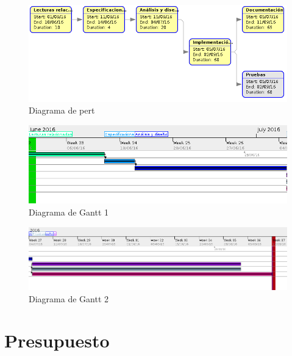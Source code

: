 \newpage
\begin{figure}[!ht]
  \begin{center}
    \includegraphics[width=1\textwidth]{../images/diag_plan/pert.png}
    \caption{Diagrama de pert}
    \label{fig:pert}
  \end{center}
\end{figure}

\begin{figure}[!ht]
  \begin{center}
    \includegraphics[width=1\textwidth]{../images/diag_plan/gantt1.png}
    \caption{Diagrama de Gantt 1}
    \label{fig:diag_gant1}
  \end{center}
\end{figure}

\begin{figure}[!ht]
  \begin{center}
    \includegraphics[width=1\textwidth]{../images/diag_plan/gantt2.png}
    \caption{Diagrama de Gantt 2}
    \label{fig:diag_gant2}
  \end{center}
\end{figure}

\newpage
\newpage

\section{Presupuesto}

